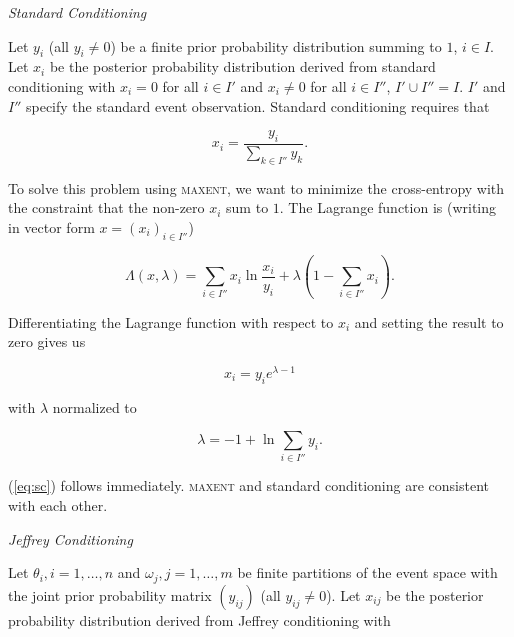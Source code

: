 \documentclass[11pt]{article}
\begin{document}
\medskip

{\noindent}\emph{Standard Conditioning}

\medskip

{\noindent}Let $y_{i}$ (all $y_{i}\neq{}0$) be a finite prior
probability distribution summing to $1$, $i\in{}I$. Let $x_{i}$ be the
posterior probability distribution derived from standard conditioning
with $x_{i}=0$ for all $i\in{}I'$ and $x_{i}\neq{}0$ for all
$i\in{}I''$, $I'\cup{}I''=I$. $I'$ and $I''$ specify the standard
event observation. Standard conditioning requires that

\begin{equation}
  \label{eq:sc}
  x_{i}=\frac{y_{i}}{\sum_{k\in{}I''}y_{k}}.
\end{equation}

To solve this problem using \textsc{maxent}, we want to minimize the
cross-entropy with the constraint that the non-zero $x_{i}$ sum to
$1$. The Lagrange function is (writing in vector form
$x=(x_{i})_{i\in{}I''}$)

\begin{equation}
  \label{eq:sclag}
  \Lambda(x,\lambda)=\sum_{i\in{}I''}x_{i}\ln\frac{x_{i}}{y_{i}}+\lambda\left(1-\sum_{i\in{}I''}x_{i}\right).
\end{equation}

Differentiating the Lagrange function with respect to $x_{i}$ and
setting the result to zero gives us

\begin{equation}
  \label{eq:sc1}
  x_{i}=y_{i}e^{\lambda-1}
\end{equation}

with $\lambda$ normalized to

\begin{equation}
  \label{eq:sc2}
  \lambda=-1+\ln{}\sum_{i\in{}I''}y_{i}.
\end{equation}

(\ref{eq:sc}) follows immediately. \textsc{maxent} and standard
conditioning are consistent with each other.

\medskip

{\noindent}\emph{Jeffrey Conditioning}

\medskip

{\noindent}Let $\theta_{i},i=1,\ldots,n$ and
$\omega_{j},j=1,\ldots,m$ be finite partitions of the event space with
the joint prior probability matrix $(y_{ij})$ (all $y_{ij}\neq{}0$).
Let $x_{ij}$ be the posterior probability distribution derived from
Jeffrey conditioning with 
\end{document}

